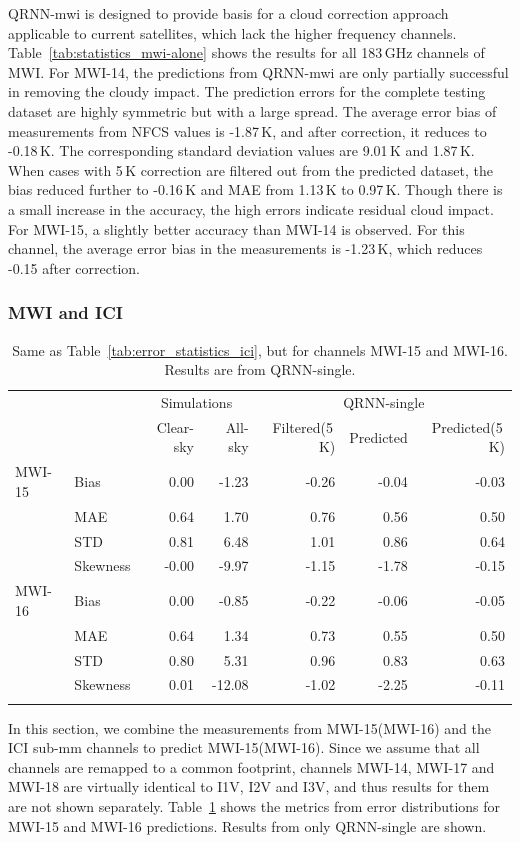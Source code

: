 \documentclass[amt, manuscript]{copernicus}
\begin{document}
QRNN-mwi is designed to provide basis for a cloud correction approach applicable to current satellites, which lack the higher frequency channels. Table~\ref{tab:statistics_mwi-alone} shows the results for all 183\,GHz channels of MWI. For MWI-14, the predictions from QRNN-mwi are only partially successful in removing the cloudy impact. The prediction errors for the complete testing dataset are highly symmetric but with a large spread. The average error bias of measurements from NFCS values is -1.87\,K, and after correction, it reduces to -0.18\,K. The corresponding standard deviation values are 9.01\,K and 1.87\,K. When cases with 5\,K correction are filtered out from the predicted dataset, the bias reduced further to -0.16\,K and MAE from 1.13\,K to 0.97\,K. Though there is a small increase in the accuracy, the high errors indicate residual cloud impact. For MWI-15, a slightly better accuracy than MWI-14 is observed. For this channel, the average error bias in the measurements is -1.23\,K, which  reduces -0.15 after correction.  
\subsubsection{MWI and ICI}
\begin{table}[t]
	\caption{Same as Table~\ref{tab:error_statistics_ici}, but for channels MWI-15 and MWI-16. Results are from QRNN-single.}
	\label{tab:statistics_mwi}
	\begin{tabular}{llrr|rrr}
		\tophline
				&&\multicolumn{2}{c|}{Simulations}& \multicolumn{3}{c}{QRNN-single} \\
				\cline{3-7}
				&&   Clear-sky &   All-sky &  Filtered(5\,K) & Predicted & Predicted(5\,K) \\
		\middlehline
		MWI-15  &Bias     &  0.00 & -1.23 & -0.26 & -0.04 & -0.03 \\
				&MAE      &  0.64 &  1.70 &  0.76 &  0.56 &  0.50 \\
				&STD      &  0.81 &  6.48 &  1.01 &  0.86 &  0.64 \\
				&Skewness & -0.00 & -9.97 & -1.15 & -1.78 & -0.15 \\
		\middlehline
		MWI-16  &Bias     & 0.00 &  -0.85 & -0.22 & -0.06 & -0.05 \\
				&MAE      & 0.64 &   1.34 &  0.73 &  0.55 &  0.50 \\
				&STD      & 0.80 &   5.31 &  0.96 &  0.83 &  0.63 \\
				&Skewness & 0.01 & -12.08 & -1.02 & -2.25 & -0.11 \\
		\bottomhline			
	\end{tabular}	
	\belowtable{} %
\end{table}
In this section, we combine the measurements from MWI-15(MWI-16) and the ICI sub-mm channels to predict MWI-15(MWI-16). Since we assume that all channels are remapped to a common footprint, channels MWI-14, MWI-17 and MWI-18 are virtually identical to I1V, I2V and I3V, and thus results for them are not shown separately. Table~\ref{tab:statistics_mwi} shows the metrics from error distributions for MWI-15 and MWI-16 predictions. Results from only QRNN-single are shown. 
\end{document}
